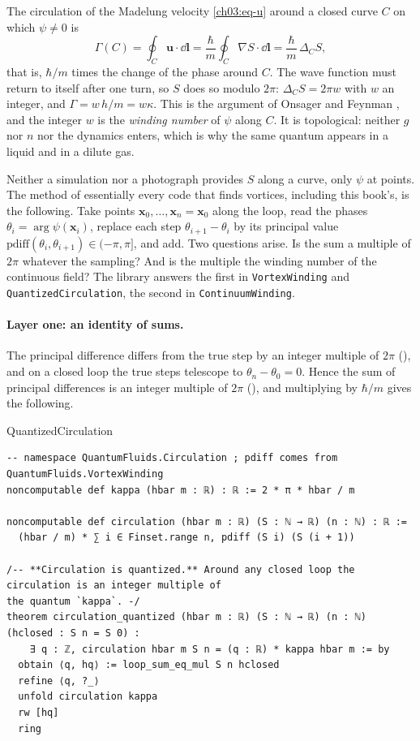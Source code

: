 The circulation of the Madelung velocity \eqref{ch03:eq-u} around a closed curve $C$ on which $\psi\neq0$ is
\begin{equation}\label{ch03:eq-gamma}
  \Gamma(C)=\oint_C\mathbf u\cdot\dd\mathbf l=\frac{\hbar}{m}\oint_C\nabla S\cdot\dd\mathbf l=\frac{\hbar}{m}\,\Delta_C S ,
\end{equation}
that is, $\hbar/m$ times the change of the phase around $C$. The wave function must return to itself after one turn, so $S$ does so modulo $2\pi$: $\Delta_CS=2\pi w$ with $w$ an integer, and $\Gamma=w\,h/m=w\kappa$. This is the argument of Onsager \cite{Onsager1949} and Feynman \cite{Feynman1955}, and the integer $w$ is the \emph{winding number} of $\psi$ along $C$. It is topological: neither $g$ nor $n$ nor the dynamics enters, which is why the same quantum appears in a liquid and in a dilute gas.

Neither a simulation nor a photograph provides $S$ along a curve, only $\psi$ at points. The method of essentially every code that finds vortices, including this book's, is the following. Take points $\mathbf x_0,\dots,\mathbf x_n=\mathbf x_0$ along the loop, read the phases $\theta_i=\arg\psi(\mathbf x_i)$, replace each step $\theta_{i+1}-\theta_i$ by its principal value $\mathrm{pdiff}(\theta_i,\theta_{i+1})\in(-\pi,\pi]$, and add. Two questions arise. Is the sum a multiple of $2\pi$ whatever the sampling? And is the multiple the winding number of the continuous field? The library answers the first in \texttt{VortexWinding} and \texttt{QuantizedCirculation}, the second in \texttt{ContinuumWinding}.

\paragraph{Layer one: an identity of sums.} The principal difference differs from the true step by an integer multiple of $2\pi$ (), and on a closed loop the true steps telescope to $\theta_n-\theta_0=0$. Hence the sum of principal differences is an integer multiple of $2\pi$ (), and multiplying by $\hbar/m$ gives the following.

\begin{leanbox}{QuantizedCirculation}
\begin{lstlisting}[style=lean,basicstyle=\ttfamily\footnotesize]
-- namespace QuantumFluids.Circulation ; pdiff comes from QuantumFluids.VortexWinding
noncomputable def kappa (hbar m : ℝ) : ℝ := 2 * π * hbar / m

noncomputable def circulation (hbar m : ℝ) (S : ℕ → ℝ) (n : ℕ) : ℝ :=
  (hbar / m) * ∑ i ∈ Finset.range n, pdiff (S i) (S (i + 1))

/-- **Circulation is quantized.** Around any closed loop the circulation is an integer multiple of
the quantum `kappa`. -/
theorem circulation_quantized (hbar m : ℝ) (S : ℕ → ℝ) (n : ℕ) (hclosed : S n = S 0) :
    ∃ q : ℤ, circulation hbar m S n = (q : ℝ) * kappa hbar m := by
  obtain ⟨q, hq⟩ := loop_sum_eq_mul S n hclosed
  refine ⟨q, ?_⟩
  unfold circulation kappa
  rw [hq]
  ring
\end{lstlisting}
\end{leanbox}

